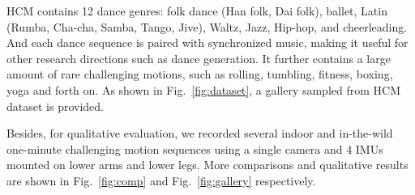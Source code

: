 \documentclass[letterpaper]{article} \usepackage{aaai23}  \usepackage{times}  \usepackage{helvet}  \usepackage{courier}  \usepackage[hyphens]{url}  \usepackage{graphicx} \urlstyle{rm} \def\UrlFont{\rm}  \usepackage{natbib}  \usepackage{caption} \frenchspacing  \setlength{\pdfpagewidth}{8.5in}  \setlength{\pdfpageheight}{11in}  \usepackage{algorithm}
\begin{document}
HCM contains 12 dance genres: folk dance (Han folk, Dai folk), ballet, Latin (Rumba, Cha-cha, Samba, Tango, Jive), Waltz, Jazz, Hip-hop, and cheerleading. And each dance sequence is paired with synchronized music, making it useful for other research directions such as dance generation.
It further contains a large amount of rare challenging motions, such as rolling, tumbling, fitness, boxing, yoga and forth on. 
As shown in Fig.~\ref{fig:dataset}, a gallery sampled from HCM dataset is provided.

\vspace{-1pt}
Besides, for qualitative evaluation, we recorded several indoor and in-the-wild one-minute challenging motion sequences using a single camera and 4 IMUs mounted on lower arms and lower legs. 
More comparisons and qualitative results are shown in Fig.~\ref{fig:comp} and Fig.~\ref{fig:gallery} respectively.


  
\end{document}
